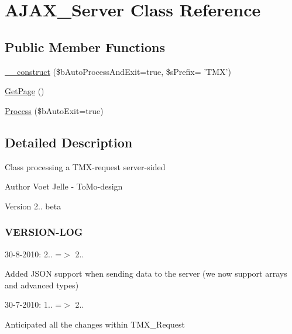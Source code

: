 \hypertarget{class_a_j_a_x___server}{\section{A\-J\-A\-X\-\_\-\-Server Class Reference}
\label{class_a_j_a_x___server}
}
\subsection*{Public Member Functions}
\begin{DoxyCompactItemize}
\item 
\hyperlink{class_a_j_a_x___server_ad2c59b18389118835d24ffa708c28592}{\-\_\-\-\_\-construct} (\$b\-Auto\-Process\-And\-Exit=true, \$s\-Prefix= 'T\-M\-X')
\item 
\hyperlink{class_a_j_a_x___server_a275ad9d504f5d6c0536b0c394128f856}{Get\-Page} ()
\item 
\hyperlink{class_a_j_a_x___server_ad0383584d768341adee4af6d26776b62}{Process} (\$b\-Auto\-Exit=true)
\end{DoxyCompactItemize}


\subsection{Detailed Description}
Class processing a T\-M\-X-\/request server-\/sided

\begin{DoxyAuthor}{Author}
Voet Jelle -\/ To\-Mo-\/design 
\end{DoxyAuthor}
\begin{DoxyVersion}{Version}
2.. beta
\end{DoxyVersion}
\subsubsection*{V\-E\-R\-S\-I\-O\-N-\/\-L\-O\-G }

30-\/8-\/2010\-: 2.. =$>$ 2..
\begin{DoxyItemize}
\item Added J\-S\-O\-N support when sending data to the server (we now support arrays and advanced types)
\end{DoxyItemize}

30-\/7-\/2010\-: 1.. =$>$ 2..
\begin{DoxyItemize}
\item Anticipated all the changes within T\-M\-X\-\_\-\-Request 
\end{DoxyItemize}

